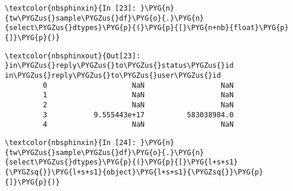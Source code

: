 \documentclass[letterpaper,10pt,english]{sphinxmanual}
\begin{document}
%
\begin{Verbatim}[commandchars=\\\{\}]
\textcolor{nbsphinxin}{In [23]: }\PYG{n}{tw\PYGZus{}sample\PYGZus{}df}\PYG{o}{.}\PYG{n}{select\PYGZus{}dtypes}\PYG{p}{(}\PYG{p}{[}\PYG{n+nb}{float}\PYG{p}{]}\PYG{p}{)}
\end{Verbatim}

%
\begin{Verbatim}[commandchars=\\\{\}]
\textcolor{nbsphinxout}{Out[23]: }in\PYGZus{}reply\PYGZus{}to\PYGZus{}status\PYGZus{}id  in\PYGZus{}reply\PYGZus{}to\PYGZus{}user\PYGZus{}id
         0                    NaN                  NaN
         1                    NaN                  NaN
         2                    NaN                  NaN
         3           9.555443e+17          583038984.0
         4                    NaN                  NaN
\end{Verbatim}

%
\begin{Verbatim}[commandchars=\\\{\}]
\textcolor{nbsphinxin}{In [24]: }\PYG{n}{tw\PYGZus{}sample\PYGZus{}df}\PYG{o}{.}\PYG{n}{select\PYGZus{}dtypes}\PYG{p}{(}\PYG{p}{[}\PYG{l+s+s1}{\PYGZsq{}}\PYG{l+s+s1}{object}\PYG{l+s+s1}{\PYGZsq{}}\PYG{p}{]}\PYG{p}{)}
\end{Verbatim}
\end{document}
